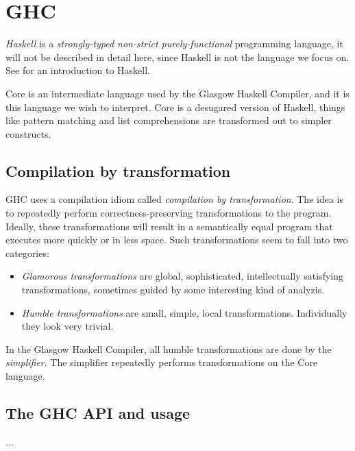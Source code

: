 \section{GHC}

\emph{Haskell} is a \emph{strongly-typed non-strict purely-functional} programming language, it will not be
described in detail here, since Haskell is not the language we focus on. See \cite{hudak1992report}
for an introduction to Haskell. 

Core is an intermediate language used by the Glasgow Haskell Compiler\cite{ghc},
and it is this language we wish to interpret. Core is a desugared version of Haskell, things like pattern matching
and list comprehensions are transformed out to simpler constructs.\cite{jones1994compilation}

\subsection{Compilation by transformation}

GHC uses a compilation idiom called \emph{compilation by transformation}. The idea is to repeatedly perform 
correctness-preserving transformations to the program. Ideally, these transformations will result
in a semantically equal program that executes more quickly or in less space. Such transformations seem
to fall into two categories:

\begin{itemize} 
\item{\emph{Glamorous transformations}} are global, sophisticated, intellectually satisfying transformations,
sometimes guided by some interesting kind of analyzis.
\item{\emph{Humble transformations}} are small, simple, local transformations. Individually they look very trivial.
\end{itemize}

In the Glasgow Haskell Compiler, all humble transformations are done by the \emph{simplifier}. 
\cite{jones1994compilation} The simplifier repeatedly performs transformations on the Core language.


\subsection{The GHC API and usage}

...


